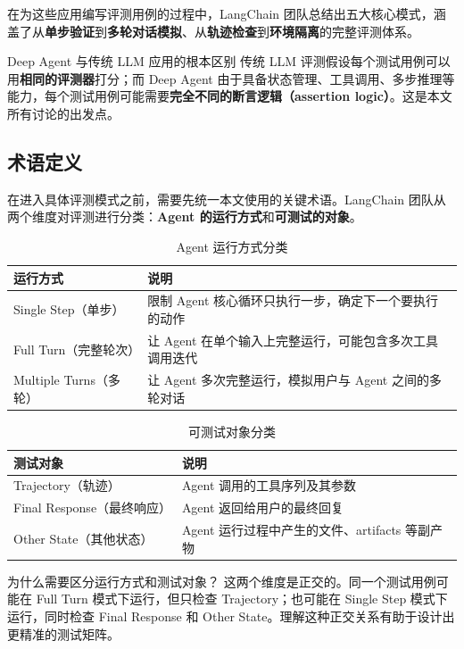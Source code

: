 \documentclass[a4paper]{article}
\begin{document}
在为这些应用编写评测用例的过程中，LangChain 团队总结出五大核心模式，涵盖了从\textbf{单步验证}到\textbf{多轮对话模拟}、从\textbf{轨迹检查}到\textbf{环境隔离}的完整评测体系。

\begin{importantbox}{Deep Agent 与传统 LLM 应用的根本区别}
传统 LLM 评测假设每个测试用例可以用\textbf{相同的评测器}打分；而 Deep Agent 由于具备状态管理、工具调用、多步推理等能力，每个测试用例可能需要\textbf{完全不同的断言逻辑（assertion logic）}。这是本文所有讨论的出发点。
\end{importantbox}

\subsection{术语定义}

在进入具体评测模式之前，需要先统一本文使用的关键术语。LangChain 团队从两个维度对评测进行分类：\textbf{Agent 的运行方式}和\textbf{可测试的对象}。

\begin{table}[H]
\centering
\caption{Agent 运行方式分类}
\begin{tabular}{lp{10cm}}
\toprule
\textbf{运行方式} & \textbf{说明} \\
\midrule
Single Step（单步） & 限制 Agent 核心循环只执行一步，确定下一个要执行的动作 \\
Full Turn（完整轮次） & 让 Agent 在单个输入上完整运行，可能包含多次工具调用迭代 \\
Multiple Turns（多轮） & 让 Agent 多次完整运行，模拟用户与 Agent 之间的多轮对话 \\
\bottomrule
\end{tabular}
\end{table}

\begin{table}[H]
\centering
\caption{可测试对象分类}
\begin{tabular}{lp{10cm}}
\toprule
\textbf{测试对象} & \textbf{说明} \\
\midrule
Trajectory（轨迹） & Agent 调用的工具序列及其参数 \\
Final Response（最终响应） & Agent 返回给用户的最终回复 \\
Other State（其他状态） & Agent 运行过程中产生的文件、artifacts 等副产物 \\
\bottomrule
\end{tabular}
\end{table}

\begin{knowledgebox}{为什么需要区分运行方式和测试对象？}
这两个维度是正交的。同一个测试用例可能在 Full Turn 模式下运行，但只检查 Trajectory；也可能在 Single Step 模式下运行，同时检查 Final Response 和 Other State。理解这种正交关系有助于设计出更精准的测试矩阵。
\end{knowledgebox}
\end{document}

